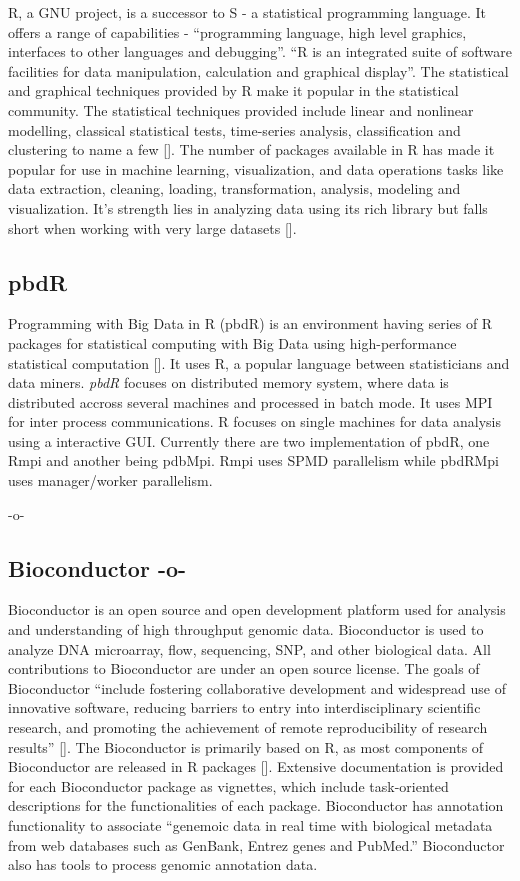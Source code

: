 R, a GNU project, is a successor to S - a statistical programming
language. It offers a range of capabilities - ``programming language,
high level graphics, interfaces to other languages and
debugging''. ``R is an integrated suite of software facilities for
data manipulation, calculation and graphical display''. The
statistical and graphical techniques provided by R make it popular in
the statistical community. The statistical techniques provided include
linear and nonlinear modelling, classical statistical tests,
time-series analysis, classification and clustering to name a
few [\cite{www-R}]. The number of packages available in R has made it
popular for use in machine learning, visualization, and data
operations tasks like data extraction, cleaning, loading,
transformation, analysis, modeling and visualization. It's strength
lies in analyzing data using its rich library but falls short when
working with very large datasets [\cite{book-R}].
    
\subsection{pbdR}

Programming with Big Data in R (pbdR) is an environment having series
of R packages for statistical computing with Big Data using
high-performance statistical computation [\cite{www-pbdR}]. It uses R, a
popular language between statisticians and data miners. \textit{pbdR} focuses
on distributed memory system, where data is distributed accross
several machines and processed in batch mode. It uses MPI for inter
process communications. R focuses on single machines for data analysis
using a interactive GUI. Currently there are two implementation of
pbdR, one Rmpi and another being pdbMpi.  Rmpi uses SPMD parallelism
while pbdRMpi uses manager/worker parallelism.

    -o-

\subsection{Bioconductor -o-}

Bioconductor is an open source and open development platform used for
analysis and understanding of high throughput genomic
data. Bioconductor is used to analyze DNA microarray, flow,
sequencing, SNP, and other biological data. All contributions to
Bioconductor are under an open source license. The goals of
Bioconductor ``include fostering collaborative development and
widespread use of innovative software, reducing barriers to entry into
interdisciplinary scientific research, and promoting the achievement
of remote reproducibility of research
results'' [\cite{bioconductor-article-2004}].  The Bioconductor is
primarily based on R, as most components of Bioconductor are released
in R packages [\cite{www-bioconductor-about}].  Extensive documentation
is provided for each Bioconductor package as vignettes, which include
task-oriented descriptions for the functionalities of each
package. Bioconductor has annotation functionality to associate
``genemoic data in real time with biological metadata from web
databases such as GenBank, Entrez genes and PubMed.''  Bioconductor
also has tools to process genomic annotation data.

